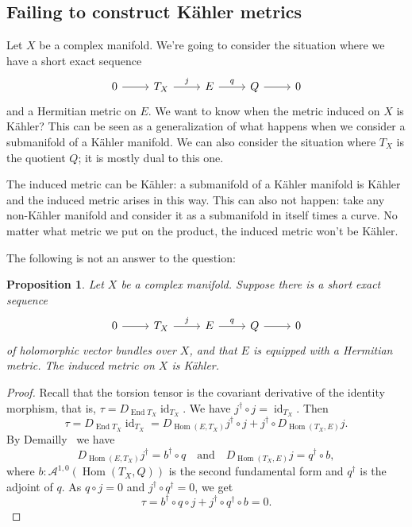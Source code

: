 \documentclass[10pt,a4paper]{article}
\newtheorem{prop}[theo]{Proposition}
\newtheorem*{proof}{Proof}
\newcommand{\cc}[1]{\mathcal{#1}}
\def\qandq{\quad\text{and}\quad}
\DeclareMathOperator{\End}{End}
\DeclareMathOperator{\Hom}{Hom}
\DeclareMathOperator{\id}{id}
\begin{document}
\subsection{Failing to construct K\"ahler metrics}


Let $X$ be a complex manifold. We're going to consider the situation where we have a short exact sequence
\[
\begin{tikzcd}
0 \arrow[r] & T_X \arrow[r,"j"] & E \arrow[r,"q"] & Q \arrow[r] & 0
\end{tikzcd}
\]
and a Hermitian metric on $E$. We want to know when the metric induced on $X$ is K\"ahler? This can be seen as a generalization of what happens when we consider a submanifold of a K\"ahler manifold. We can also consider the situation where $T_X$ is the quotient $Q$; it is mostly dual to this one.

The induced metric can be K\"ahler: a submanifold of a K\"ahler manifold is K\"ahler and the induced metric arises in this way. This can also not happen: take any non-K\"ahler manifold and consider it as a submanifold in itself times a curve. No matter what metric we put on the product, the induced metric won't be K\"ahler.

The following is not an answer to the question:



\begin{prop}
Let $X$ be a complex manifold. Suppose there is a short exact sequence
\[
\begin{tikzcd}
0 \arrow[r] & T_X \arrow[r,"j"] & E \arrow[r,"q"] & Q \arrow[r] & 0
\end{tikzcd}
\]
of holomorphic vector bundles over $X$, and that $E$ is equipped with a Hermitian metric. The induced metric on $X$ is K\"ahler.
\end{prop}

\begin{proof}
Recall that the torsion tensor is the covariant derivative of the identity morphism, that is, $\tau = D_{\End T_X} \id_{T_X}$.
We have $j^\dagger \circ j = \id_{T_X}$. Then
\[
\tau
= D_{\End T_X} \id_{T_X}
= D_{\Hom(E,T_X)}j^\dagger \circ j + j^\dagger \circ D_{\Hom(T_X,E)}j.
\]
By Demailly~\cite[Theorem~14.3]{demailly-complex} we have
\[
D_{\Hom(E,T_X)}j^\dagger
= b^\dagger \circ q
\qandq
D_{\Hom(T_X,E)}j
= q^\dagger \circ b,
\]
where $b : \cc A^{1,0}(\Hom(T_X,Q))$ is the second fundamental form and $q^\dagger$ is the adjoint of $q$.
As $q \circ j = 0$ and $j^\dagger \circ q^\dagger = 0$, we get
\[
\tau
= b^\dagger \circ q \circ j
+ j^\dagger \circ q^\dagger \circ b
= 0.
\]
\end{proof}
\end{document}
